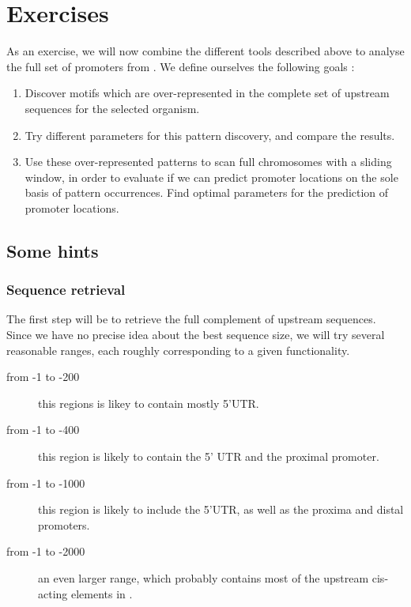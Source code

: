 
\chapter{Exercises}

As an exercise, we will now combine the different tools described
above to analyse the full set of promoters from . We define ourselves the following goals :
\begin{enumerate}
\item Discover motifs which are over-represented in the complete set
of upstream sequences for the selected organism. 
\item Try different parameters for this pattern discovery, and compare
the results.
\item Use these over-represented patterns to scan full chromosomes
with a sliding window, in order to evaluate if we can predict promoter
locations on the sole basis of pattern occurrences. Find optimal
parameters for the prediction of promoter locations.
\end{enumerate}

\section{Some hints}

\subsection{Sequence retrieval}

The first step will be to retrieve the full complement of upstream
sequences. Since we have no precise idea about the best sequence size,
we will try several reasonable ranges, each roughly corresponding to a
given functionality.

\begin{description}
\item[from -1 to -200] this regions is likey to contain mostly 5'UTR.
\item[from -1 to -400] this region is likely to contain the 5' UTR and
the proximal promoter.
\item[from -1 to -1000] this region is likely to include the 5'UTR,
as well as the proxima and distal promoters. 
\item[from -1 to -2000] an even larger range, which probably contains
most of the upstream cis-acting elements in .
\end{description}

